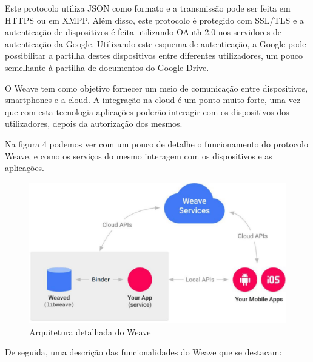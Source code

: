 Este protocolo utiliza JSON como formato e a transmissão pode ser feita em HTTPS ou em XMPP. Além disso, este protocolo é protegido com SSL/TLS e a autenticação de dispositivos é feita utilizando OAuth 2.0 nos servidores de autenticação da Google. Utilizando este esquema de autenticação, a Google pode possibilitar a partilha destes dispositivos entre diferentes utilizadores, um pouco semelhante à partilha de documentos do Google Drive.

O Weave tem como objetivo fornecer um meio de comunicação entre dispositivos, smartphones e a cloud. A integração na cloud é um ponto muito forte, uma vez que com esta tecnologia aplicações poderão interagir com os dispositivos dos utilizadores, depois da autorização dos mesmos.

Na figura 4 podemos ver com um pouco de detalhe o funcionamento do protocolo Weave, e como os serviços do mesmo interagem com os dispositivos e as aplicações.

\begin{figure}[H]
  \centering
        \includegraphics[width=\textwidth]{img/weave1.png}
  \caption{Arquitetura detalhada do Weave}
\end{figure}

De seguida, uma descrição das funcionalidades do Weave que se destacam:

